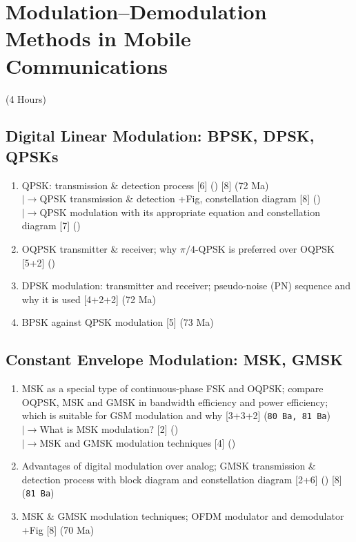 \documentclass[12pt]{article}
\newcommand{\lb}{\\$\left|\rightarrow\right.$}
\begin{document}
\pagebreak
\section{Modulation--Demodulation Methods in Mobile Communications}
\begin{center}(4 Hours)\end{center}

  \subsection{Digital Linear Modulation: BPSK, DPSK, QPSKs}
    \begin{enumerate}[topsep=0pt, noitemsep]
      \item QPSK: transmission \& detection process \hfill [6] () [8] (72 Ma)
        \lb QPSK transmission \& detection +Fig, constellation diagram \hfill [8] ()
        \lb QPSK modulation with its appropriate equation and constellation diagram \hfill [7] ()
      \item OQPSK transmitter \& receiver; why $\pi/4$-QPSK is preferred over OQPSK \hfill [5+2] ()
      \item DPSK modulation: transmitter and receiver; pseudo-noise (PN) sequence and why it is used
        \hfill [4+2+2] (72 Ma)
      \item BPSK against QPSK modulation \hfill [5] (73 Ma)
    \end{enumerate}

  \subsection{Constant Envelope Modulation: MSK, GMSK}
    \begin{enumerate}[topsep=0pt, noitemsep]
      \item MSK as a special type of continuous-phase FSK and OQPSK;
        compare OQPSK, MSK and GMSK in bandwidth efficiency and power efficiency;
        which is suitable for GSM modulation and why \hfill [3+3+2] (\texttt{80 Ba, 81 Ba})
        \lb What is MSK modulation? \hfill [2] ()
        \lb MSK and GMSK modulation techniques \hfill [4] ()
      \item Advantages of digital modulation over analog; GMSK transmission \& detection
        process with block diagram and constellation diagram \hfill [2+6] () [8] (\texttt{81 Ba})
      \item MSK \& GMSK modulation techniques; OFDM modulator and demodulator +Fig \hfill [8] (70 Ma)
    \end{enumerate}
\end{document}
